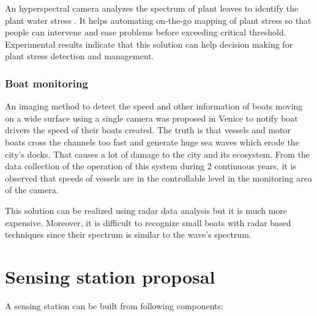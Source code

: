\documentclass[10pt,a4paper]{article}
\begin{document}
An hyperspectral camera analyzes the spectrum of plant leaves to identify the plant water stress \cite{Hyperspectra001}. It helps automating on-the-go  mapping of plant stress so that people can intervene and ease problems before exceeding critical threshold. Experimental results indicate that this solution can help decision making for plant stress detection and management.


\subsubsection {Boat monitoring}

An imaging method \cite{Broggi2009} to detect the speed and other information of boats moving on a wide surface using a single camera was proposed in Venice to notify boat drivers the speed of their boats created. The truth is that vessels and motor boats cross the channels too fast and generate huge sea waves which erode the city's docks. That causes a lot of damage to the city and its ecosystem. From the data collection of the operation of this system during 2 continuous years, it is observed that speeds of vessels are in the controllable level in the monitoring area of the camera.

This solution can be realized using radar data analysis \cite{Radar4653898} but it is much more expensive. Moreover, it is difficult to recognize small boats with radar based techniques since their spectrum is similar to the wave's spectrum.

\section{Sensing station proposal}

A sensing station can be built from following components:
\end{document}
